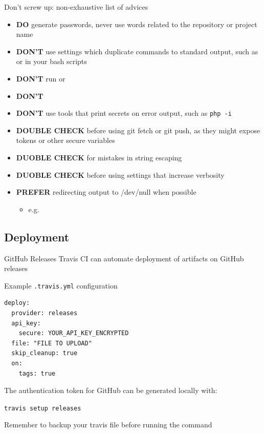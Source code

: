 \documentclass[presentation]{beamer}
\begin{document}
\begin{frame}{Don't screw up: non-exhaustive list of advices}
    \begin{itemize}
        \item \textbf{DO} generate passwords, never use words related to the repository or project name
        \item \textbf{DON'T} use settings which duplicate commands to standard output, such as  or  in your bash scripts
        \item \textbf{DON'T} run  or 
        \item \textbf{DON'T} 
        \item \textbf{DON'T} use tools that print secrets on error output, such as \texttt{php -i}
        \item \textbf{DOUBLE CHECK} before using git fetch or git push, as they might expose tokens or other secure variables
        \item \textbf{DUOBLE CHECK} for mistakes in string escaping
        \item \textbf{DUOBLE CHECK} before using settings that increase verbosity
        \item \textbf{PREFER} redirecting output to /dev/null when possible
        \begin{itemize}
            \item e.g. 
        \end{itemize}
    \end{itemize}
\end{frame}

\subsection{Deployment}

\begin{frame}[fragile]{GitHub Releases}
    Travis CI can automate deployment of artifacts on GitHub releases
    \begin{block}{Example \texttt{.travis.yml} configuration}
        \begin{verbatim}
deploy:
  provider: releases
  api_key:
    secure: YOUR_API_KEY_ENCRYPTED
  file: "FILE TO UPLOAD"
  skip_cleanup: true
  on:
    tags: true
        \end{verbatim}
    \end{block}
    The authentication token for GitHub can be generated locally with:
    
    \texttt{travis setup releases}
    
    Remember to backup your travis file before running the command
\end{frame}
\end{document}
